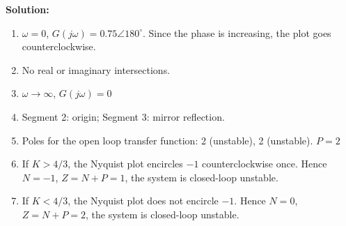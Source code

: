 \documentclass{article}
\begin{document}
\begin{enumerate}
  {\bf Solution:}
  \begin{enumerate}

  \item $\omega = 0$, $G(j\omega) = 0.75\angle 180^\circ$. Since the phase is increasing, the plot goes counterclockwise.
  \item No real or imaginary intersections.
  \item $\omega\rightarrow \infty$, $G(j\omega) = 0$
  \item Segment 2: origin; Segment 3: mirror reflection.
  \item Poles for the open loop transfer function: 2 (unstable), 2 (unstable). $P=2$
  \item  If $K > 4/3$, the Nyquist plot encircles $-1$ counterclockwise once. Hence $N = -1$, $Z = N+P = 1$, the system is closed-loop unstable.
  \item  If $K < 4/3$, the Nyquist plot does not encircle $-1$. Hence $N = 0$, $Z = N+P = 2$, the system is closed-loop unstable.
  \end{enumerate}
\end{enumerate}
\end{document}
